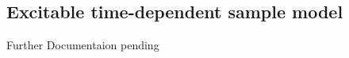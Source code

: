 \subsection*{Excitable time-dependent sample model}
\label{molecule_2state}

Further Documentaion pending

